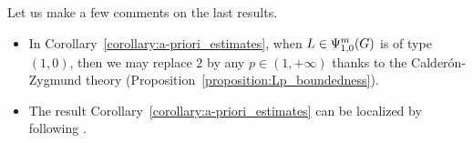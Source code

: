 \begin{remark}
    Let us make a few comments on the last results.

    \begin{itemize}
        \item In Corollary~\ref{corollary:a-priori_estimates},
            when $L \in \Psi^{m}_{1, 0}(G)$ is of type $(1, 0)$,
            then we may replace $2$ by any $p \in (1, +\infty)$
            thanks to the Calder\'on-Zygmund theory (Proposition~\ref{proposition:Lp_boundedness}).
        \item
            The result Corollary~\ref{corollary:a-priori_estimates} can be localized
            by following \cite[Subsection 5.8.3]{FischerRuzhansky16}.
    \end{itemize}
\end{remark}

